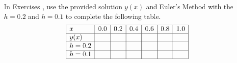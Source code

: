 {\noindent In Exercises}
{, use the provided solution $y(x)$ and Euler's Method with the $h=0.2$ and $h=0.1$ to complete the following table.\\
\[
	\begin{array}{| l | l | l | l | l | l | l |} \hline
		x                           & 0.0 & 0.2 & 0.4 & 0.6 & 0.8 & 1.0 \\ \hline
		y(x) &     &     &     &     &     &     \\ \hline
		h = 0.2                     &     &     &     &     &     &     \\ \hline
		h = 0.1                     &     &     &     &     &     &\\ \hline
	\end{array}
\]}
